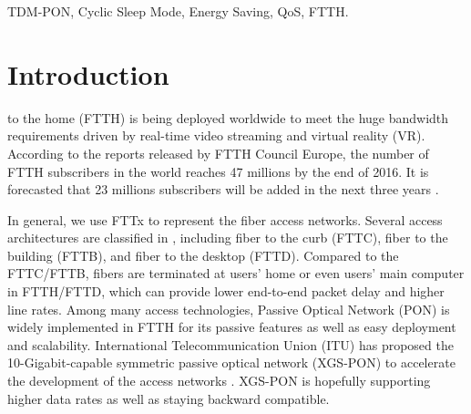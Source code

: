 \documentclass[journal]{IEEEtran}
\begin{document}
\begin{IEEEkeywords}
TDM-PON, Cyclic Sleep Mode, Energy Saving, QoS, FTTH.
\end{IEEEkeywords}






%
\IEEEpeerreviewmaketitle



\section{Introduction}
% 
% 
% 
% 
 to the home (FTTH) is being deployed worldwide to meet the huge bandwidth requirements driven by real-time video streaming and virtual reality (VR). According to the reports released by FTTH Council Europe, the number of FTTH subscribers in the world reaches 47 millions by the end of 2016. It is forecasted that 23 millions subscribers will be added in the next three years \cite{ftth}.

In general, we use FTTx to represent the fiber access networks. Several access architectures are classified in \cite{IEEFTTx}, including fiber to the curb (FTTC), fiber to the building (FTTB), and fiber to the desktop (FTTD). Compared to the FTTC/FTTB, fibers are terminated at users' home or even users' main computer in FTTH/FTTD, which can provide lower end-to-end packet delay and higher line rates. Among many access technologies, Passive Optical Network (PON) is widely implemented in FTTH for its passive features as well as easy deployment and scalability. International Telecommunication Union (ITU) has proposed the 10-Gigabit-capable symmetric passive optical network (XGS-PON) to accelerate the development of the access networks \cite{IEEERecommend}. XGS-PON is hopefully supporting higher data rates as well as staying backward compatible.
\end{document}
